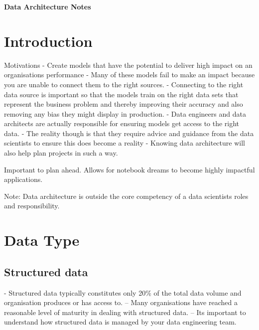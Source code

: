 \documentclass[a4paper, 11pt]{article}
\begin{document}
    \begin{titlepage}
        \centering
        \vspace*{2in}
        \Huge \textbf{Data Architecture Notes}
    \end{titlepage}

    \setcounter{section}{0}

    \newpage

    \tableofcontents
    \newpage

    \section{Introduction}
    Motivations
    - Create models that have the potential to deliver high impact on an organisations performance
    - Many of these models fail to make an impact because you are unable to connect them to the right sources.
    - Connecting to the right data source is important so that the models train on the right data sets that represent the business problem and thereby improving their accuracy and also removing any bias they might display in production.
    - Data engineers and data architects are actually responsible for ensuring models get access to the right data.
    - The reality though is that they require advice and guidance from the data scientists to ensure this does become a reality
    - Knowing data architecture will also help plan projects in such a way.

    Important to plan ahead.
    Allows for notebook dreams to become highly impactful applications.

    Note: Data architecture is outside the core competency of a data scientists roles and responsibility.


    \section{Data Type}

    \subsection{Structured data}
    - Structured data typically constitutes only 20\% of the total data volume and organisation produces or has access to.
    -- Many organisations have reached a reasonable level of maturity in dealing with structured data.
    -- Its important to understand how structured data is managed by your data engineering team.
\end{document}
